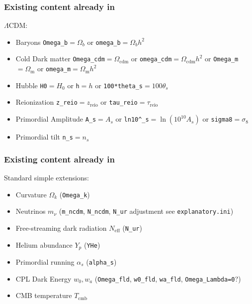 \begin{frame}[fragile]
 	\frametitle{Existing content already in \CLASS{}}
 	$\Lambda$CDM:
 	\begin{itemize}
 		\item {\Red Baryons} \texttt{Omega\_b}$=\Omega_b$ or \texttt{omega\_b}$=\Omega_b h^2$
 		\pause \item {\Red Cold Dark matter} \texttt{Omega\_cdm}$=\Omega_\mathrm{cdm}$ or \texttt{omega\_cdm}$=\Omega_\mathrm{cdm} h^2$ or \texttt{Omega\_m}$=\Omega_\mathrm{m}$ or \texttt{omega\_m}$=\Omega_\mathrm{m} h^2$
 		\pause \item {\Red Hubble} \texttt{H0}$=H_0$ or \texttt{h}$=h$ or \texttt{100*theta\_s}$=100\theta_s$
 		\pause \item {\Red Reionization} \texttt{z\_reio}$=z_\mathrm{reio}$ or \texttt{tau\_reio}$=\tau_\mathrm{reio}$
 		\pause \item {\Red Primordial Amplitude} \texttt{A\_s}$=A_s$ or \texttt{ln10\textasciicircum\_s}$=\ln(10^{10}A_s)$ or \texttt{sigma8}$=\sigma_8$
 		\pause \item {\Red Primordial tilt} \texttt{n\_s}$=n_s$
 	\end{itemize}
\end{frame}


\begin{frame}[fragile]
	\frametitle{Existing content already in \CLASS{}}
	Standard simple extensions:
	\begin{itemize}
		\pause \item {\Red Curvature} $\Omega_k$ (\texttt{Omega\_k})
		\pause \item {\Red Neutrinos} $m_\nu$ (\texttt{m\_ncdm}, \texttt{N\_ncdm}, {\color{purple} \texttt{N\_ur} adjustment} see \texttt{explanatory.ini})
		\pause \item {\Red Free-streaming dark radiation} $N_\mathrm{eff}$ (\texttt{N\_ur})
		\pause \item {\Red Helium abundance} $Y_p$ (\texttt{YHe})
		\pause \item {\Red Primordial running} $\alpha_s$ (\texttt{alpha\_s})
		\pause \item {\Red CPL Dark Energy} $w_0, w_a$ (\texttt{Omega\_fld}, \texttt{w0\_fld}, \texttt{wa\_fld}, {\color{purple} \texttt{Omega\_Lambda=0}?})
		\pause \item CMB temperature $T_\mathrm{cmb}$ 
	\end{itemize}
\end{frame}


